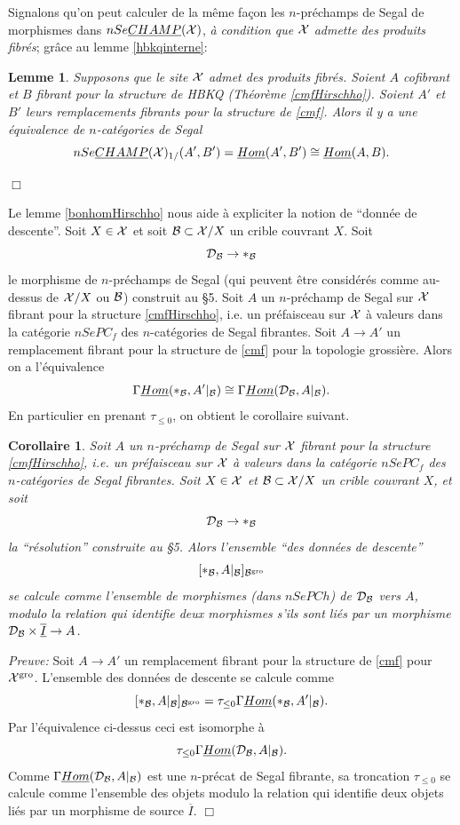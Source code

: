 \documentclass[12pt]{article}
\newcommand{\eop}{\hfill $\Box$\vspace{.1in}}
\newtheorem{lemme}[lemma]{Lemme}
\newtheorem{corollaire}[lemma]{Corollaire}
\newcommand{\Bb}{{\cal B}}
\newcommand{\Xx}{{\cal X}}
\begin{document}
Signalons qu'on peut calculer de la m\^eme fa\c{c}on les $n$-pr\'echamps
de Segal de morphismes dans $nSe\underline{CHAMP}(\Xx )$, {\em \`a condition
que $\Xx$ admette des produits fibr\'es}; gr\^ace au lemme
\ref{hbkqinterne}:

\begin{lemme}
\label{bonhomHirschho2}
Supposons que le site $\Xx$ admet des produits fibr\'es.
Soient $A$ cofibrant et $B$ fibrant pour la structure de
HBKQ (Th\'eor\`eme \ref{cmfHirschho}). Soient $A'$ et $B'$
leurs remplacements fibrants pour la structure de \ref{cmf}. Alors
il y a une \'equivalence de $n$-cat\'egories de Segal
$$
nSe\underline{CHAMP}(\Xx )_{1/}(A',B')=\underline{Hom}(A',B')\cong
\underline{Hom}(A,B).
$$
\end{lemme}
\eop

Le lemme \ref{bonhomHirschho} nous aide \`a expliciter la notion de ``donn\'ee
de descente''. Soit $X\in \Xx$ et soit $\Bb \subset \Xx /X$ un crible
couvrant $X$. Soit
$$
{\cal D}_{\Bb} \rightarrow \ast _{\Bb}
$$
le morphisme de $n$-pr\'echamps de Segal (qui peuvent \^etre consid\'er\'es
comme
au-dessus de $\Xx /X$ ou $\Bb$) construit au \S 5.
Soit $A$ un $n$-pr\'echamp de Segal sur $\Xx$ fibrant pour la structure
\ref{cmfHirschho}, i.e. un pr\'efaisceau sur $\Xx$ \`a valeurs dans la
cat\'egorie
$nSePC_f$ des $n$-cat\'egories de Segal fibrantes.
Soit $A\rightarrow A'$ un remplacement fibrant pour la structure de \ref{cmf}
pour la topologie grossi\`ere. Alors on a l'\'equivalence
$$
\Gamma \underline{Hom} (\ast _{\Bb}, A'|_{\Bb})
\cong \Gamma \underline{Hom}({\cal D}_{\Bb}, A|_{\Bb}).
$$
En particulier en prenant $\tau _{\leq 0}$,
on obtient
le corollaire suivant.

\begin{corollaire}
\label{calculDescente}
Soit $A$ un $n$-pr\'echamp de Segal sur $\Xx$ fibrant pour la structure
\ref{cmfHirschho}, i.e. un pr\'efaisceau sur $\Xx$ \`a valeurs dans la
cat\'egorie
$nSePC_f$ des $n$-cat\'egories de Segal fibrantes.
Soit $X\in \Xx$ et  $\Bb \subset \Xx /X$ un crible couvrant $X$, et soit
$$
{\cal D}_{\Bb} \rightarrow \ast _{\Bb}
$$
la ``r\'esolution'' construite au \S 5. Alors l'ensemble
``des donn\'ees de descente''
$$
[\ast _{\Bb}, A|_{\Bb}]_{\Bb ^{\rm
gro}}
$$
se calcule comme l'ensemble de morphismes (dans $nSePCh$) de ${\cal
D}_{\Bb}$ vers
$A$, modulo la relation qui
identifie deux morphismes s'ils sont li\'es par un
morphisme ${\cal D}_{\Bb} \times \underline{\overline{I}}\rightarrow A$.
\end{corollaire}
{\em Preuve:}
Soit $A\rightarrow A'$ un remplacement fibrant pour la structure de \ref{cmf}
pour $\Xx ^{\rm gro}$.
L'ensemble des donn\'ees de descente se calcule comme
$$
[\ast _{\Bb}, A|_{\Bb}]_{\Bb ^{\rm
gro}}
=\tau _{\leq 0}\Gamma \underline{Hom} (\ast _{\Bb}, A'|_{\Bb}).
$$
Par l'\'equivalence ci-dessus ceci est isomorphe \`a
$$
\tau _{\leq 0}\Gamma \underline{Hom} ({\cal D}_{\Bb}, A|_{\Bb}).
$$
Comme
$\Gamma \underline{Hom} ({\cal D}_{\Bb}, A|_{\Bb})$ est une $n$-pr\'ecat de
Segal
fibrante, sa troncation $\tau _{\leq 0}$ se calcule comme l'ensemble des
objets
modulo la relation qui identifie
deux objets li\'es par un morphisme de source $\overline{I}$.
\eop
\end{document}
